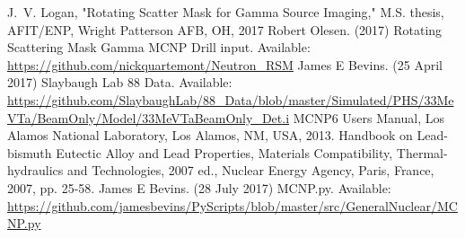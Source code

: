 \documentclass[journal]{IEEEtran}
\begin{document}
	\ifCLASSOPTIONcaptionsoff
	\newpage
	\fi
	
	
	
	\begin{thebibliography}{6}
		J.~V. Logan, "Rotating Scatter Mask for Gamma Source Imaging," M.S. thesis, AFIT/ENP, Wright Patterson AFB, OH, 2017
		Robert Olesen. (2017) Rotating Scattering Mask Gamma MCNP Drill input. Available:
		\url{https://github.com/nickquartemont/Neutron_RSM} 
		James E Bevins. (25 April 2017) Slaybaugh Lab 88 Data. Available: \url{https://github.com/SlaybaughLab/88_Data/blob/master/Simulated/PHS/33MeVTa/BeamOnly/Model/33MeVTaBeamOnly_Det.i}
		MCNP6 Users Manual, Los Alamos National Laboratory, Los Alamos, NM, USA, 2013.
		Handbook on Lead-bismuth Eutectic Alloy and Lead Properties, Materials Compatibility, Thermal-hydraulics and Technologies, 2007 ed., Nuclear Energy Agency, Paris, France, 2007, pp. 25-58.
		James E Bevins. (28 July 2017) MCNP.py. Available:
		\url{https://github.com/jamesbevins/PyScripts/blob/master/src/GeneralNuclear/MCNP.py}
	\end{thebibliography}
	
\end{document}
